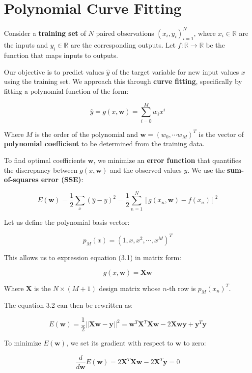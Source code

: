 \section{Polynomial Curve Fitting}\label{sec:polynomial_curve_fitting}

Consider a \textbf{training set} of $N$ paired observations $(x_i, y_i)_{i=1}^N$, where $x_i \in \mathbb{R}$ are the inputs and $y_i \in \mathbb{R}$ are the corresponding outputs.
Let $f: \mathbb{R} \to \mathbb{R}$ be the function that maps inputs to outputs.

Our objective is to predict values $\hat{y}$ of the target variable for new input values $x$ using the training set.
We approach this through \textbf{curve fitting}, specifically by fitting a polynomial function of the form:

\[
    \hat{y} = g(x, \mathbf{w}) = \sum_{i = 0}^{M}{w_{i}x^i} \tag{3.1}
\]

Where $M$ is the order of the polynomial and $\mathbf{w} = (w_0, \cdots w_M)^T$ is the vector of \textbf{polynomial coefficient} to be determined from the training data.

To find optimal coefficients $\mathbf{w}$, we minimize an \textbf{error function} that quantifies the discrepancy between $g(x, \mathbf{w})$ and the observed values $y$.
We use the \textbf{sum-of-squares error (SSE)}:

\[
    E(\mathbf{w})
    = \frac{1}{2}\sum_{x}{ (\hat{y} - y)^2 }
    = \frac{1}{2}\sum_{n = 1}^{N}{ \left[ g(x_n, \mathbf{w}) - f(x_n) \right]^2 } \tag{3.2}
\]

Let us define the polynomial basis vector:

\[
    p_M(x) = (1, x, x^2, \cdots, x^M)^T
\]

This allows us to expression equation (3.1) in matrix form:

\[
    g(x, \mathbf{w}) = \mathbf{Xw} \tag{3.3}
\]

Where $\mathbf{X}$ is the $N \times (M + 1)$ design matrix whose $n$-th row is $p_M(x_n)^T$.

The equation 3.2 can then be rewritten as:

\[
    E(\mathbf{w})
    = \frac{1}{2} || \mathbf{Xw} - \mathbf{y} ||^2
    = \mathbf{w}^T\mathbf{X}^T\mathbf{Xw} - 2\mathbf{Xwy} + \mathbf{y}^{T}\mathbf{y} \tag{3.4}
\]

To minimize $E(\mathbf{w})$, we set its gradient with respect to $\mathbf{w}$ to zero:

\[
    \frac{d}{d\mathbf{w}}E(\mathbf{w})
    = 2\mathbf{X}^T\mathbf{Xw} - 2\mathbf{X}^T\mathbf{y} = 0
\]

